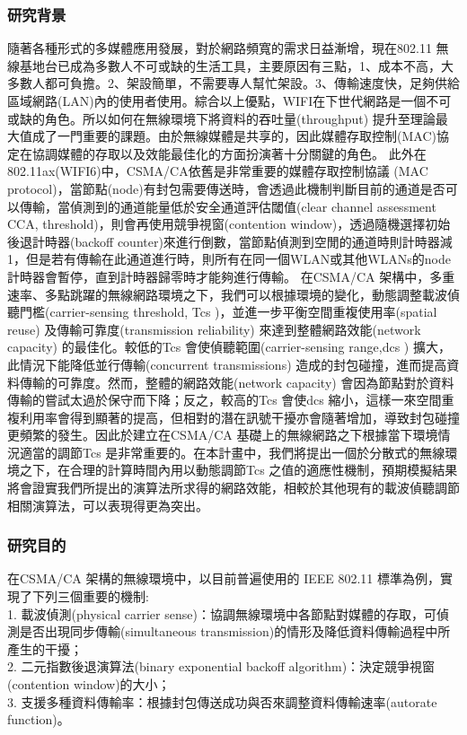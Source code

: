 \documentclass[12pt,a4paper]{article}
\begin{document}
\begin{description}
\subsubsection{研究背景}%
隨著各種形式的多媒體應用發展，對於網路頻寬的需求日益漸增，現在802.11 無線基地台已成為多數人不可或缺的生活工具，主要原因有三點，1、成本不高，大多數人都可負擔。2、架設簡單，不需要專人幫忙架設。3、傳輸速度快，足夠供給區域網路(LAN)內的使用者使用。綜合以上優點，WIFI在下世代網路是一個不可或缺的角色。所以如何在無線環境下將資料的吞吐量(throughput) 提升至理論最大值成了一門重要的課題。由於無線媒體是共享的，因此媒體存取控制(MAC)協定在協調媒體的存取以及效能最佳化的方面扮演著十分關鍵的角色。
此外\cite{31}在802.11ax(WIFI6)中，CSMA/CA依舊是非常重要的媒體存取控制協議 (MAC protocol)，當節點(node)有封包需要傳送時，會透過此機制判斷目前的通道是否可以傳輸，當偵測到的通道能量低於安全通道評估閾值(clear channel assessment CCA, threshold)，則會再使用競爭視窗(contention window)，透過隨機選擇初始後退計時器(backoff counter)來進行倒數，當節點偵測到空閒的通道時則計時器減1，但是若有傳輸在此通道進行時，則所有在同一個WLAN或其他WLANs的node計時器會暫停，直到計時器歸零時才能夠進行傳輸。
在CSMA/CA 架構中，多重速率、多點跳躍的無線網路環境之下，我們可以根據環境的變化，動態調整載波偵聽門檻(carrier-sensing threshold, Tcs )，並進一步平衡空間重複使用率(spatial reuse) 及傳輸可靠度(transmission reliability) 來達到整體網路效能(network capacity) 的最佳化。較低的Tcs 會使偵聽範圍(carrier-sensing range,dcs ) 擴大，此情況下能降低並行傳輸(concurrent transmissions) 造成的封包碰撞，進而提高資料傳輸的可靠度。然而，整體的網路效能(network capacity) 會因為節點對於資料傳輸的嘗試太過於保守而下降；反之，較高的Tcs 會使dcs 縮小，這樣一來空間重複利用率會得到顯著的提高，但相對的潛在訊號干擾亦會隨著增加，導致封包碰撞更頻繁的發生。因此於建立在CSMA/CA 基礎上的無線網路之下根據當下環境情況適當的調節Tcs 是非常重要的。在本計畫中，我們將提出一個於分散式的無線環境之下，在合理的計算時間內用以動態調節Tcs 之值的適應性機制，預期模擬結果將會證實我們所提出的演算法所求得的網路效能，相較於其他現有的載波偵聽調節相關演算法，可以表現得更為突出。\\



\subsubsection{研究目的}%

在CSMA/CA 架構的無線環境中，以目前普遍使用的 IEEE 802.11 標準為例，實現了下列三個重要的機制: \\
1. 載波偵測(physical carrier sense)：協調無線環境中各節點對媒體的存取，可偵測是否出現同步傳輸(simultaneous transmission)的情形及降低資料傳輸過程中所產生的干擾；\\
2. 二元指數後退演算法(binary exponential backoff algorithm)：決定競爭視窗(contention window)的大小；\\
3. 支援多種資料傳輸率：根據封包傳送成功與否來調整資料傳輸速率(autorate function)。


\end{description}
\end{document}
